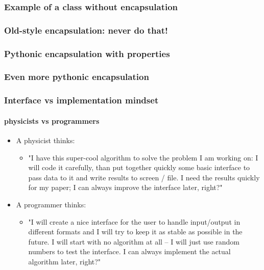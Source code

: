\documentclass[9pt]{beamer}
\begin{document}
\begin{frame}
  \frametitle{Example of a class without encapsulation}
  
\end{frame}


\begin{frame}
  \frametitle{Old-style encapsulation: never do that!}
  
\end{frame}



\begin{frame}
  \frametitle{Pythonic encapsulation with properties}
  
\end{frame}


\begin{frame}
  \frametitle{Even more pythonic encapsulation}
  
\end{frame}


\begin{frame}
  \frametitle{Interface vs implementation mindset}
  \framesubtitle{physicists vs programmers}
  
  \begin{itemize}
    
    \item A physicist thinks:
        
    \medskip
      
    \begin{itemize}
      \item "I have this super-cool algorithm to solve the problem I am working on:
             I will code it carefully, than put together quickly some basic 
             interface to pass data to it and write results to screen / file.
             I need the results quickly for my paper; I can always improve the 
             interface later, right?"
    \end{itemize}
    \medskip
      
    \item A programmer thinks:
    
    \medskip
    
    \begin{itemize}
      \item "I will create a nice interface for the user to handle input/output
             in different formats and I will try to keep it as stable as 
             possible in the future.
             I will start with no algorithm at all -- I will just use random
             numbers to test the interface. I can always implement the
             actual algorithm later, right?"
    \end{itemize}

  \end{itemize}

\end{frame}
 
\end{document}
